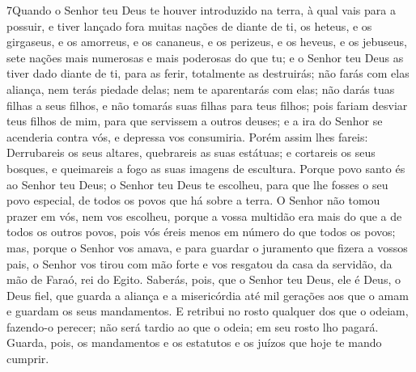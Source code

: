 \lettrine{7} Quando o Senhor teu Deus te houver introduzido na
terra, à qual vais para a possuir, e tiver lançado fora muitas
nações de diante de ti, os heteus, e os girgaseus, e os amorreus, e
os cananeus, e os perizeus, e os heveus, e os jebuseus, sete nações
mais numerosas e mais poderosas do que tu; e o Senhor teu Deus
as tiver dado diante de ti, para as ferir, totalmente as destruirás;
não farás com elas aliança, nem terás piedade delas; nem te
aparentarás com elas; não darás tuas filhas a seus filhos, e não
tomarás suas filhas para teus filhos; pois fariam desviar teus
filhos de mim, para que servissem a outros deuses; e a ira do Senhor
se acenderia contra vós, e depressa vos consumiria. Porém assim
lhes fareis: Derrubareis os seus altares, quebrareis as suas
estátuas; e cortareis os seus bosques, e queimareis a fogo as suas
imagens de escultura. Porque povo santo és ao Senhor teu Deus; o
Senhor teu Deus te escolheu, para que lhe fosses o seu povo
especial, de todos os povos que há sobre a terra. O Senhor não
tomou prazer em vós, nem vos escolheu, porque a vossa multidão era
mais do que a de todos os outros povos, pois vós éreis menos em
número do que todos os povos; mas, porque o Senhor vos amava, e
para guardar o juramento que fizera a vossos pais, o Senhor vos
tirou com mão forte e vos resgatou da casa da servidão, da mão de
Faraó, rei do Egito. Saberás, pois, que o Senhor teu Deus, ele é
Deus, o Deus fiel, que guarda a aliança e a misericórdia até mil
gerações aos que o amam e guardam os seus mandamentos. E
retribui no rosto qualquer dos que o odeiam, fazendo-o perecer; não
será tardio ao que o odeia; em seu rosto lho pagará. Guarda,
pois, os mandamentos e os estatutos e os juízos que hoje te mando
cumprir.

